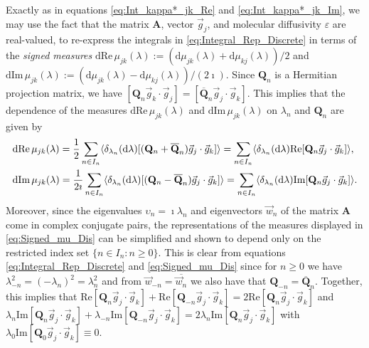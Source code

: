 \documentclass[11pt]{amsart}
\renewcommand{\d}{\mathrm{d}}
\newcommand{\Ab}{\mathbf{A}}
\newcommand{\Qb}{\mathbf{Q}}
\begin{document}
Exactly as in equations \eqref{eq:Int_kappa*_jk_Re} and
\eqref{eq:Int_kappa*_jk_Im}, we may use the fact that the matrix
$\Ab$, vector $\vec{g}_j$, and molecular diffusivity $\varepsilon$ are
real-valued, to re-express the integrals in
\eqref{eq:Integral_Rep_Discrete} in terms of the \emph{signed
  measures} 
$\d\text{Re}\,\mu_{jk}(\lambda):=(\d\mu_{jk}(\lambda)+\d\mu_{kj}(\lambda))/2$ and
$\d\text{Im}\,\mu_{jk}(\lambda):=(\d\mu_{jk}(\lambda)-\d\mu_{kj}(\lambda))/(2\imath)$. Since
$\Qb_n$ is a Hermitian projection matrix, we have
$[\Qb_n\vec{g}_k\cdot\vec{g}_j]=[\overline{\Qb}_n\vec{g}_j\cdot\vec{g}_k]$. This
implies that the dependence of the measures 
$\d\text{Re}\,\mu_{jk}(\lambda)$ and $\d\text{Im}\,\mu_{jk}(\lambda)$ on $\lambda_n$ and
$\Qb_n$ are given by  
%
\begin{align}\label{eq:Signed_mu_Dis}
  &\d\text{Re}\,\mu_{jk}(\lambda)      
      =\frac{1}{2}\sum_{n\in I_n}\langle\delta_{\lambda_n}(\d\lambda)[(\Qb_n+\overline{\Qb}_n)\vec{g}_j\cdot\vec{g}_k]\rangle
      =\sum_{n\in I_n}\langle\delta_{\lambda_n}(\d\lambda)\text{Re}[\Qb_n\vec{g}_j\cdot\vec{g}_k]\rangle,
      \\
  &\d\text{Im}\,\mu_{jk}(\lambda)
      =\frac{1}{2\imath}\sum_{n\in I_n}\langle\delta_{\lambda_n}(\d\lambda)[(\Qb_n-\overline{\Qb}_n)\vec{g}_j\cdot\vec{g}_k]\rangle
      =\sum_{n\in I_n}\langle\delta_{\lambda_n}(\d\lambda)\text{Im}[\Qb_n\vec{g}_j\cdot\vec{g}_k]\rangle.
      \notag
\end{align}
%
Moreover, since the eigenvalues $\upsilon_n=\imath\lambda_n$ and eigenvectors
$\vec{w}_n$ of the matrix $\Ab$ come in complex conjugate pairs, the
representations of the measures displayed in \eqref{eq:Signed_mu_Dis}
can be simplified and shown \cite{Pavliotis:PHD_Thesis} to depend only
on the restricted index set $\{n\in I_n:n\geq0\}$. This is clear from equations
\eqref{eq:Integral_Rep_Discrete} and \eqref{eq:Signed_mu_Dis} since
for $n\geq0$ we have $\lambda_{-n}^2=(-\lambda_n)^2=\lambda_n^2$ and from
$\vec{w}_{-n}=\overline{\vec{w}_n}$ we also have that
$\Qb_{-n}=\overline{\Qb}_n$. Together, this implies that
$\text{Re}[\Qb_n\vec{g}_j\cdot\vec{g}_k]+\text{Re}[\Qb_{-n}\vec{g}_j\cdot\vec{g}_k] 
=2\text{Re}[\Qb_n\vec{g}_j\cdot\vec{g}_k]$ and
$\lambda_n\text{Im}[\Qb_n\vec{g}_j\cdot\vec{g}_k]+\lambda_{-n}\text{Im}[\Qb_{-n}\vec{g}_j\cdot\vec{g}_k]
=2\lambda_n\text{Im}[\Qb_n\vec{g}_j\cdot\vec{g}_k]$ with
$\lambda_0\text{Im}[\Qb_0\vec{g}_j\cdot\vec{g}_k]\equiv0$.
\end{document}
